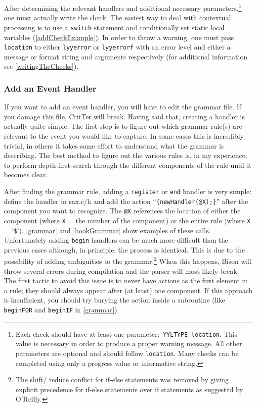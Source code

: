 \documentclass[12pt]{report}
\newcommand{\programName}{CritTer\xspace}
\begin{document}
After determining the relevant handlers and additional necessary parameters,\footnote{Each check 
should have at least one parameter:\ \lstinline{YYLTYPE location}. This value is necessary in order to 
produce a proper warning message. All other parameters are optional and should follow 
\lstinline{location}. Many checks can be completed using only a progress value or informative string.} 
one must actually write the check. The easiest way to deal with contextual processing is to use a 
\lstinline{switch} statement and conditionally set static local variables (\autoref{addCheckExample}). In 
order to throw a warning, one must pass \lstinline{location} to either \lstinline{lyyerror} or 
\lstinline{lyyerrorf} with an error level and either a message or format string and arguments respectively 
(for additional information see \autoref{writingTheChecks}).

\subsubsection{Add an Event Handler}

If you want to add an event handler, you will have to edit the grammar file. If you damage this file,  
\programName will break. Having said that, creating a handler is actually quite simple. The first 
step is to figure out which grammar rule(s) are relevant to the event you would like to capture. In some 
cases this is incredibly trivial, in others it takes some effort to understand what the grammar is describing. 
The best method to figure out the various rules is, in my experience, to perform depth-first-search through 
the different components of the rule until it becomes clear. 

After finding the grammar rule, adding a \lstinline{register} or \lstinline{end} handler is very simple: 
define the handler in sax.c/h and add the action ``\lstinline!{newHandler(@X);}!'' after the component you 
want to recognize. The \lstinline{@X} references the location of either the component (where \lstinline{X} 
= the number of the component) or the entire rule (where \lstinline{X} = `\lstinline{$}'). \autoref{grammar}
 and \autoref{hookGrammar} show examples of these calls. Unfortunately adding \lstinline{begin} 
handlers can be much more difficult than the previous cases although, in principle, the process is 
identical. This is due to the possibility of adding ambiguities to the grammar.\footnote{The shift\slash 
reduce conflict for if-else statements was removed by giving explicit precedence for if-else statements 
over if statements as suggested by O'Reilly\cite[p.~188]{flex-and-bison}.} When this happens, Bison will 
throw several errors during compilation and the parser will most likely break. The first tactic to avoid this 
issue is to never have actions as the first element in a rule; they should always appear after (at least) one 
component. If this approach is insufficient, you should try burying the action inside a subroutine (like 
\lstinline{beginFOR} and \lstinline{beginIF} in \autoref{grammar}).
\end{document}
